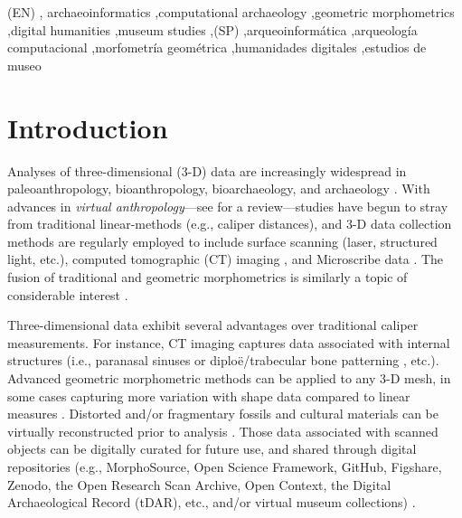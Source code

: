 \documentclass[review]{elsarticle}
\begin{document}
\begin{frontmatter}
\begin{keyword} 
(EN) \sep
archaeoinformatics \sep computational archaeology \sep geometric morphometrics \sep digital humanities \sep  museum studies \sep (SP) \sep arqueoinformática  \sep arqueología computacional  \sep morfometría geométrica \sep humanidades digitales  \sep  estudios de museo
\end{keyword}

\end{frontmatter}
\newpage
\linenumbers
\section{Introduction}

Analyses of three-dimensional (3-D) data are increasingly widespread in paleoanthropology, bioanthropology, bioarchaeology, and archaeology \citep{RN1746,RN5887,RN303,RN1735,RN5900}. With advances in \textit{virtual anthropology}---see \citet{RN5902} for a review---studies have begun to stray from traditional linear-methods (e.g., caliper distances), and 3-D data collection methods are regularly employed to include surface scanning (laser, structured light, etc.), computed tomographic (CT) imaging \citep{RN11489}, and Microscribe data \citep{RN11487}. The fusion of traditional and geometric morphometrics is similarly a topic of considerable interest \citep{RN11945}.

Three-dimensional data exhibit several advantages over traditional caliper measurements. For instance, CT imaging captures data associated with internal structures (i.e., paranasal sinuses \citep{RN5882,RN11490} or diploë/trabecular bone patterning \citep{RN5885,RN5884}, etc.). Advanced geometric morphometric methods can be applied to any 3-D mesh, in some cases capturing more variation with shape data compared to linear measures \citep{RN5880,RN5888}. Distorted and/or fragmentary fossils and cultural materials can be virtually reconstructed prior to analysis \citep{RN5889,Heid1,RN5903,RN5904,RN8985}. Those data associated with scanned objects can be digitally curated for future use, and shared through digital repositories (e.g., MorphoSource, Open Science Framework, GitHub, Figshare, Zenodo, the Open Research Scan Archive, Open Context, the Digital Archaeological Record (tDAR), etc., and/or virtual museum collections) \citep{RN5881,RN5890,RN5587,RN5922,RN8322,RN9358,RN11522}.
\end{document}
